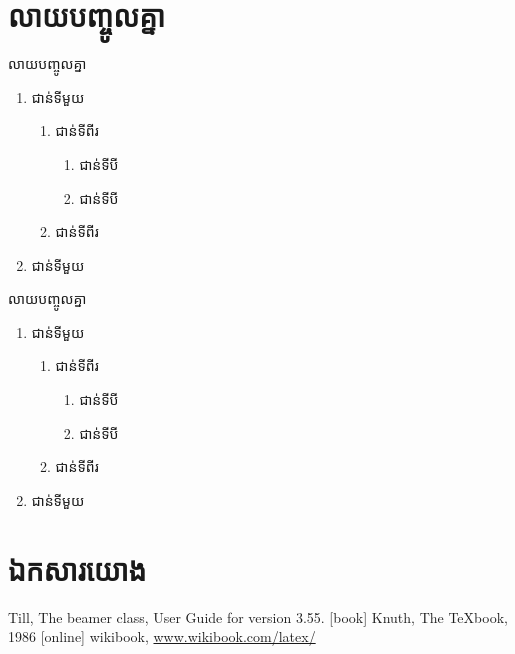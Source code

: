 \documentclass[11pt,serif]{beamer}
\begin{document}
    \section{លាយបញ្ចូលគ្នា}
    \begin{frame}{លាយបញ្ចូលគ្នា}
        \begin{theorem}
            \begin{enumerate}[A]
            \item ជាន់ទីមួយ
            \begin{enumerate}[1]
                \item ជាន់ទីពីរ
                \begin{enumerate}[i]
                    \item ជាន់ទីបី
                    \item ជាន់ទីបី
                \end{enumerate}
                \item ជាន់ទីពីរ
            \end{enumerate}
            \item ជាន់ទីមួយ
        \end{enumerate}
        \end{theorem}
    \end{frame}
    \begin{frame}{លាយបញ្ចូលគ្នា}
        \begin{example}
            \begin{enumerate}[<+-|alert@+>][I]
                \item ជាន់ទីមួយ
                \begin{enumerate}[1]
                    \item ជាន់ទីពីរ
                    \begin{enumerate}[a]
                        \item ជាន់ទីបី
                        \item ជាន់ទីបី
                    \end{enumerate}
                    \item ជាន់ទីពីរ
                \end{enumerate}
                \item ជាន់ទីមួយ
            \end{enumerate}
        \end{example}
    \end{frame}
\section{ឯកសារយោង}
\begin{frame}
    \begin{thebibliography}{4}
         Till, The beamer class,
        \newblock User Guide for version 3.55.
        [book]
         Knuth, The TeXbook, 1986
        [online]
         wikibook, \url{www.wikibook.com/latex/}
    \end{thebibliography}
\end{frame}
\end{document}
